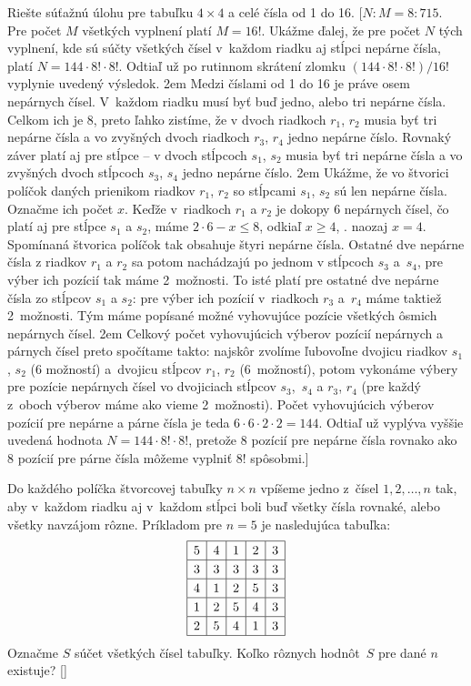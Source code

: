 {Riešte súťažnú úlohu pre tabuľku $4 \times 4$ a celé čísla od 1 do 16.
[$N:M=8:715$. Pre počet $M$ všetkých vyplnení platí $M=16!$. Ukážme ďalej,
že pre počet $N$ tých vyplnení, kde sú súčty všetkých čísel v~každom
riadku aj stĺpci nepárne čísla, platí $N=144\cdot8!\cdot8!$. Odtiaľ
už po rutinnom skrátení zlomku $(144\cdot8!\cdot8!)/16!$ vyplynie
uvedený výsledok.
  \hfill\break\hglue2em
Medzi číslami od 1 do 16 je práve osem nepárnych čísel. V~každom
riadku musí byť buď jedno, alebo tri nepárne čísla. Celkom ich je 8,
preto ľahko zistíme, že v dvoch riadkoch $r_1$, $r_2$
musia byť tri nepárne čísla a vo zvyšných dvoch riadkoch $r_3$, $r_4$
jedno nepárne číslo. Rovnaký záver platí aj pre stĺpce --
v dvoch stĺpcoch $s_1$, $s_2$ musia byť tri nepárne čísla
a vo zvyšných dvoch stĺpcoch $s_3$, $s_4$ jedno nepárne číslo.
  \hfill\break\hglue2em
Ukážme, že vo štvorici políčok daných prienikom riadkov $r_1$, $r_2$
so stĺpcami $s_1$, $s_2$ sú len
nepárne čísla. Označme ich počet $x$. Keďže
v~riadkoch $r_1$ a $r_2$ je dokopy $6$ nepárnych čísel, čo platí
aj pre stĺpce $s_1$ a $s_2$, máme $2\cdot 6 - x \leq 8$, odkiaľ
$x\geq 4$, \tj. naozaj $x=4$. Spomínaná štvorica políčok
tak obsahuje štyri nepárne čísla. Ostatné dve nepárne čísla z riadkov
$r_1$ a $r_2$ sa potom nachádzajú po jednom v stĺpcoch $s_3$
a~$s_4$, pre výber ich pozícií tak máme 2~možnosti.
To isté platí pre ostatné dve nepárne čísla zo stĺpcov $s_1$ a $s_2$: pre
výber ich pozícií v~riadkoch $r_3$ a~$r_4$ máme taktiež
2~možnosti. Tým máme popísané možné vyhovujúce
pozície všetkých ôsmich nepárnych čísel.
  \hfill\break\hglue2em
Celkový počet vyhovujúcich výberov pozícií nepárnych a párnych čísel
preto spočítame takto: najskôr zvolíme ľubovoľne dvojicu riadkov
$s_1$, $s_2$ (6 možností) a~dvojicu stĺpcov $r_1$, $r_2$ (6~možností), potom vykonáme výbery pre pozície
nepárnych čísel vo dvojiciach stĺpcov $s_3$,~$s_4$ a $r_3$, $r_4$
(pre každý z~oboch výberov máme ako vieme 2~možnosti).
Počet vyhovujúcich výberov pozícií pre nepárne a párne čísla
je teda ${6\cdot6\cdot2\cdot2}=144$. Odtiaľ už vyplýva vyššie uvedená
hodnota $N=144\cdot8!\cdot8!$, pretože 8 pozícií pre nepárne čísla
rovnako ako 8 pozícií pre párne čísla môžeme vyplniť 8! spôsobmi.]

Do každého políčka štvorcovej tabuľky $n\times n$ vpíšeme jedno
z~čísel $1,2,\dots,n$ tak, aby v~každom riadku aj v~každom stĺpci boli
buď všetky čísla rovnaké, alebo všetky navzájom rôzne. Príkladom pre $n=5$
je nasledujúca tabuľka:
$$
\vbox{%
\def\STRUT{\vrule width 0pt height 10.2pt depth 4.2pt}
\halign{\STRUT\vrule#&&\hbox to1.5em{\hss#\hss}\vrule\cr
\noalign{\hrule}
&$5$&$4$&$1$&$2$&$3$\cr
\noalign{\hrule}
&$3$&$3$&$3$&$3$&$3$\cr
\noalign{\hrule}
&$4$&$1$&$2$&$5$&$3$\cr
\noalign{\hrule}
&$1$&$2$&$5$&$4$&$3$\cr
\noalign{\hrule}
&$2$&$5$&$4$&$1$&$3$\cr
\noalign{\hrule}
}}
$$
Označme $S$ súčet všetkých čísel tabuľky. Koľko rôznych hodnôt~$S$ pre
dané $n$ existuje?
[]

}
